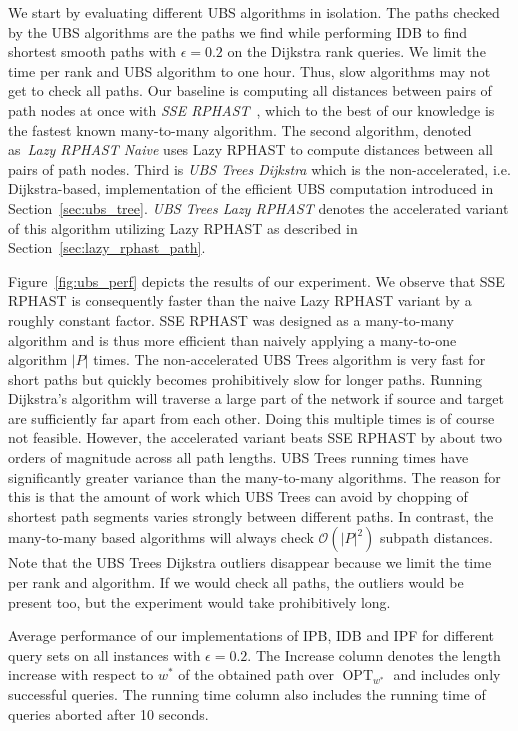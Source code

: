 \documentclass[a4paper,UKenglish,cleveref, autoref, thm-restate]{lipics-v2021}
\newcommand*{\shp}{\operatorname{OPT}}
\begin{document}
We start by evaluating different UBS algorithms in isolation.
The paths checked by the UBS algorithms are the paths we find while performing IDB to find shortest smooth paths with $\epsilon = 0.2$ on the Dijkstra rank queries.
We limit the time per rank and UBS algorithm to one hour.
Thus, slow algorithms may not get to check all paths.
Our baseline is computing all distances between pairs of path nodes at once with \emph{SSE RPHAST}~\cite{dgw-fbspr-11}, which to the best of our knowledge is the fastest known many-to-many algorithm.
The second algorithm, denoted as~\emph{Lazy RPHAST Naive} uses Lazy RPHAST to compute distances between all pairs of path nodes.
Third is \emph{UBS Trees Dijkstra} which is the non-accelerated, i.e. Dijkstra-based, implementation of the efficient UBS computation introduced in Section~\ref{sec:ubs_tree}.
\emph{UBS Trees Lazy RPHAST} denotes the accelerated variant of this algorithm utilizing Lazy RPHAST as described in Section~\ref{sec:lazy_rphast_path}.

Figure~\ref{fig:ubs_perf} depicts the results of our experiment.
We observe that SSE RPHAST is consequently faster than the naive Lazy RPHAST variant by a roughly constant factor.
SSE RPHAST was designed as a many-to-many algorithm and is thus more efficient than naively applying a many-to-one algorithm $|P|$ times.
The non-accelerated UBS Trees algorithm is very fast for short paths but quickly becomes prohibitively slow for longer paths.
Running Dijkstra's algorithm will traverse a large part of the network if source and target are sufficiently far apart from each other.
Doing this multiple times is of course not feasible.
However, the accelerated variant beats SSE RPHAST by about two orders of magnitude across all path lengths.
UBS Trees running times have significantly greater variance than the many-to-many algorithms.
The reason for this is that the amount of work which UBS Trees can avoid by chopping of shortest path segments varies strongly between different paths.
In contrast, the many-to-many based algorithms will always check $\mathcal{O}(|P|^2)$ subpath distances.
Note that the UBS Trees Dijkstra outliers disappear because we limit the time per rank and algorithm.
If we would check all paths, the outliers would be present too, but the experiment would take prohibitively long.

\begin{table}
\centering
\caption{
Average performance of our implementations of IPB, IDB and IPF for different query sets on all instances with $\epsilon = 0.2$.
The Increase column denotes the length increase with respect to $w^*$ of the obtained path over $\shp_{w^*}$ and includes only successful queries.
The running time column also includes the running time of queries aborted after 10 seconds.
}\label{tab:data}

\end{table}
\end{document}
